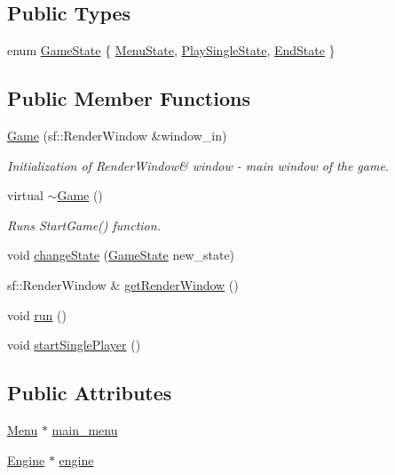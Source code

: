 \subsection*{Public Types}
\begin{DoxyCompactItemize}
\item 
enum \hyperlink{class_game_a7f57a7a8408e554d0a72882c287e1d04}{Game\+State} \{ \hyperlink{class_game_a7f57a7a8408e554d0a72882c287e1d04a7a51f25e2194782f14973800a89e58fd}{Menu\+State}, 
\hyperlink{class_game_a7f57a7a8408e554d0a72882c287e1d04a08c295bf12e492bf9d64b14d8d83b736}{Play\+Single\+State}, 
\hyperlink{class_game_a7f57a7a8408e554d0a72882c287e1d04afc92d30e44f9ec0ff71b695a3ec6d5ca}{End\+State}
 \}
\end{DoxyCompactItemize}
\subsection*{Public Member Functions}
\begin{DoxyCompactItemize}
\item 
\hyperlink{class_game_a0010695fcd27f6fc91b37b5cf3ed0543}{Game} (sf\+::\+Render\+Window \&window\+\_\+in)
\begin{DoxyCompactList}\small\item\em Initialization of Render\+Window\& window -\/ main window of the game. \end{DoxyCompactList}\item 
virtual \hyperlink{class_game_ae3d112ca6e0e55150d2fdbc704474530}{$\sim$\+Game} ()
\begin{DoxyCompactList}\small\item\em Runs Start\+Game() function. \end{DoxyCompactList}\item 
void \hyperlink{class_game_a82e2140cdedd171aecaed897d3aea5a0}{change\+State} (\hyperlink{class_game_a7f57a7a8408e554d0a72882c287e1d04}{Game\+State} new\+\_\+state)
\item 
sf\+::\+Render\+Window \& \hyperlink{class_game_ada9faa2a1f4e1453420adead02fd9865}{get\+Render\+Window} ()
\item 
void \hyperlink{class_game_a1ab78f5ed0d5ea879157357cf2fb2afa}{run} ()
\item 
void \hyperlink{class_game_afbc524f7661c9ce1bea6ca45fd212093}{start\+Single\+Player} ()
\end{DoxyCompactItemize}
\subsection*{Public Attributes}
\begin{DoxyCompactItemize}
\item 
\hyperlink{class_menu}{Menu} $\ast$ \hyperlink{class_game_a4b9b7a9db87b0ede3b39e853d69bbe1c}{main\+\_\+menu}
\item 
\hyperlink{class_engine}{Engine} $\ast$ \hyperlink{class_game_a194ef5476cf228d8960bab095b37aa23}{engine}
\end{DoxyCompactItemize}
